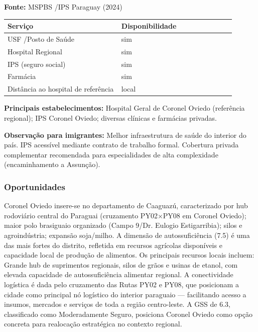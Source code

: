 \textbf{Fonte:} MSPBS /\allowbreak  IPS Paraguay (2024)

{\def\LTcaptype{none} %
\begin{longtable}{@{}>{\raggedright\arraybackslash}p{0.45\linewidth} >{\raggedright\arraybackslash}p{0.45\linewidth}@{}}
\toprule\noalign{}
Serviço & Disponibilidade \\
\midrule\noalign{}
\endhead
\bottomrule\noalign{}
\endlastfoot
USF /\allowbreak  Posto de Saúde & sim \\
Hospital Regional & sim \\
IPS (seguro social) & sim \\
Farmácia & sim \\
Distância ao hospital de referência & local \\
\end{longtable}
}

\textbf{Principais estabelecimentos:} Hospital Geral de Coronel Oviedo
(referência regional); IPS Coronel Oviedo; diversas clínicas e farmácias
privadas.

\textbf{Observação para imigrantes:} Melhor infraestrutura de saúde do
interior do país. IPS acessível mediante contrato de trabalho formal.
Cobertura privada complementar recomendada para especialidades de alta
complexidade (encaminhamento a Assunção).
\newpage

\subsubsection*{Oportunidades}\label{oport-coronel-oviedo-0501}
Coronel Oviedo insere-se no departamento de Caaguazú, caracterizado por hub rodoviário central do Paraguai (cruzamento PY02×PY08 em Coronel Oviedo); maior polo brasiguaio organizado (Campo 9/Dr. Eulogio Estigarribia); silos e agroindústria; expansão soja/milho. A dimensão de autossuficiência (7.5) é uma das mais fortes do distrito, refletida em recursos agrícolas disponíveis e capacidade local de produção de alimentos. Os principais recursos locais incluem: Grande hub de suprimentos regionais, silos de grãos e usinas de etanol, com elevada capacidade de autossuficiência alimentar regional. A conectividade logística é dada pelo cruzamento das Rutas PY02 e PY08, que posicionam a cidade como principal nó logístico do interior paraguaio — facilitando acesso a insumos, mercados e serviços de toda a região centro-leste. A GSS de 6.3, classificado como Moderadamente Seguro, posiciona Coronel Oviedo como opção concreta para realocação estratégica no contexto regional.

